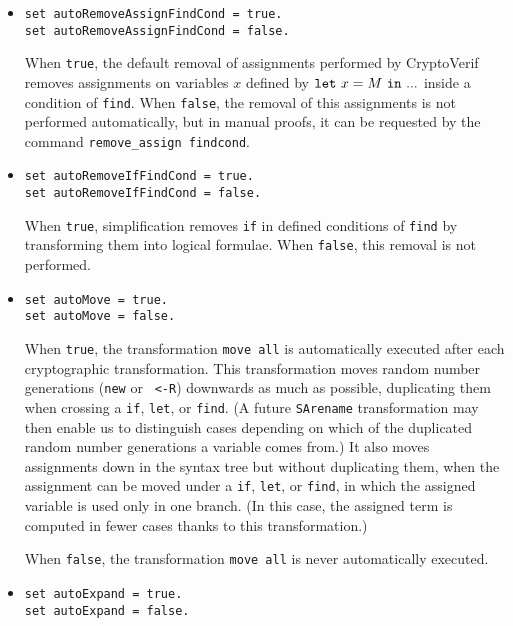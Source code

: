 \begin{itemize}
\begin{itemize}
\item \texttt{set autoRemoveAssignFindCond = true.}\\
\texttt{set autoRemoveAssignFindCond = false.}

When {\tt true}, the default removal of assignments performed by
CryptoVerif removes assignments on variables $x$ defined by
${\tt let}\ x = M\ {\tt in}\ ...$ inside a condition of {\tt find}.
When {\tt false}, the removal of this assignments is not
performed automatically, but in manual proofs, it can be requested 
by the command {\tt remove\string_assign\ findcond}.

\item \texttt{set autoRemoveIfFindCond = true.}\\
\texttt{set autoRemoveIfFindCond = false.}

When {\tt true}, simplification removes {\tt if} in defined conditions
of {\tt find} by transforming them into logical formulae.
When {\tt false}, this removal is not performed.

\item \texttt{set autoMove = true.}\\
\texttt{set autoMove = false.}

When {\tt true}, the transformation {\tt move all} is automatically
executed after each cryptographic transformation. This transformation
moves random number generations ({\tt new} or {\tt
<-R}) downwards as much as possible, duplicating them when crossing
a {\tt if}, {\tt let}, or {\tt find}.  (A future {\tt SArename}
transformation may then enable us to distinguish cases depending on
which of the duplicated random number generations a variable comes
from.)  It also moves assignments down in the syntax tree but without
duplicating them, when the assignment can be moved under a {\tt if},
{\tt let}, or {\tt find}, in which the assigned variable is used
only in one branch. (In this case, the assigned term is computed in
fewer cases thanks to this transformation.)

When {\tt false}, the transformation {\tt move all} is never
automatically executed.

\item \texttt{set autoExpand = true.}\\
\texttt{set autoExpand = false.}


\end{itemize}
\end{itemize}
